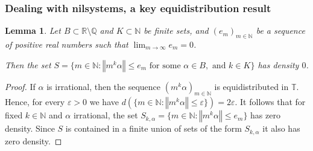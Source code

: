 \documentclass[11pt]{amsart}
\newcommand{\T}{\mathbb{T}}
\newcommand{\Q}{\mathbb{Q}}
\newcommand{\R}{\mathbb{R}}
\newcommand{\N}{\mathbb{N}}
\newcommand{\norm}[1]{\left\Vert #1\right\Vert}
\theoremstyle{plain}
\newtheorem{lemma}[theorem]{Lemma}
\theoremstyle{definition}
\theoremstyle{remark}
\begin{document}
\subsubsection{Dealing with nilsystems, a key equidistribution result}
\begin{lemma}\label{L:density0}
  Let $B\subset \R\setminus \Q$ and $K\subset \N$ be finite sets, and
  $(e_m)_{m\in\N}$ be a sequence of positive real numbers such that
  $\lim_{m\to\infty}e_m=0$.

   Then the set  $S=\{m\in \N\colon \norm{m^k\alpha}\leq
  e_m \text{ for some } \alpha\in B, \text{ and } k\in K\}$ has density $0$.
\end{lemma}
\begin{proof}
  If  $\alpha$ is irrational, then  the sequence $(m^k\alpha)_{m\in\N}$ is
  equidistributed in $\T$. Hence, for every $\varepsilon>0$ we have
  $d(\{m\in \N\colon\norm{m^k\alpha}\leq \varepsilon\})=2\varepsilon.$
  It follows that for fixed $k\in \N$ and $\alpha$ irrational, the set
  $S_{k,\alpha}=\{m\in \N\colon \norm{m^k\alpha}\leq e_m\}$ has zero
  density. Since $S$ is contained in a finite union of sets of the
  form $S_{k,\alpha}$ it also has zero density.
\end{proof}
\end{document}
